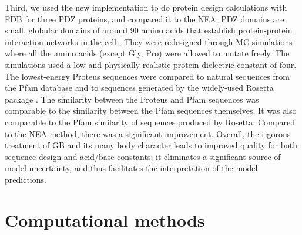 \documentclass[a4paper,12pt]{article}
\begin{document}
Third, we used the new implementation to do protein design calculations with FDB for three PDZ proteins, and compared
it to the NEA. PDZ domains are small, globular domains of around 90 amino acids that establish protein-protein interaction
networks in the cell \cite{Harris01,Hung02,Tonikian08,Gfeller11,Subbaiah11,Sheperd11r}. They were redesigned through MC
simulations where all the amino acids (except Gly, Pro) were allowed to mutate freely. The simulations used a low and
physically-realistic protein dielectric constant of four. The lowest-energy Proteus sequences were compared to natural
sequences from the Pfam database and to sequences generated by the widely-used Rosetta package \cite{Kuhlman00,Dantas03,
Rohl04,Baker06b}. The similarity between the Proteus and Pfam sequences was comparable to the similarity between the Pfam
sequences themselves. It was also comparable to the Pfam similarity of sequences produced by Rosetta. Compared to the NEA
method, there was a significant improvement. Overall, the rigorous treatment of GB and its many body character leads to
improved quality for both sequence design and acid/base constants; it eliminates a significant source of model uncertainty,
and thus facilitates the interpretation of the model predictions.

\section{Computational methods}
\end{document}
